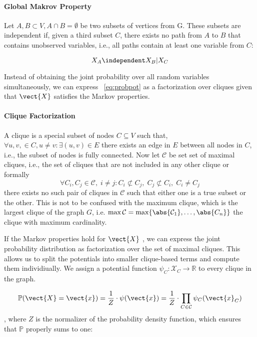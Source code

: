 \paragraph*{Global Makrov Property}
Let $A, B \subset V, A \cap B = \emptyset$ be two subsets of vertices from G. 
These subsets are independent if, given a third subset $C$, there exists no path from $A$ to $B$ that contains unobserved variables, i.e., all paths contain at least one variable from $C$:

\begin{equation}
    X_A \independent X_B \lvert X_C
\end{equation}

Instead of obtaining the joint probability over all random variables simultaneously, we can express \eq~\ref{eq:probpot} as a factorization over cliques given that $\vect{X}$ satisfies the Markov properties. 

\paragraph*{Clique Factorization}

A clique is a special subset of nodes $C \subseteq V$ such that, $\forall u,v,  \in C, u \neq v: \exists (u,v) \in E$ there exists an edge in $E$ between all nodes in $C$, i.e., the subset of nodes is fully connected.
Now let $\mathcal{C}$ be set set of maximal cliques, i.e., the set of cliques that are not included in any other clique or formally 
\begin{equation}
    \forall C_i, C_j \in \mathcal{C},\; i \neq j  : C_i \not\subset C_j,\; C_j \not\subset C_i,\; C_i \neq C_j
\end{equation}
there exists no such pair of cliques in $\mathcal{C}$ such that either one is a true subset or the other.
This is not to be confused with the maximum clique, which is the largest clique of the graph $G$, i.e. $\max \mathcal{C} = \max \{\abs{\mathcal{C}_1}, \ldots, \abs{C_n}\}$ the clique with maximum cardinality.

If the Markov properties hold for $\vect{X}$ , we can express the joint probability distribution as factorization over the set of maximal cliques.
This allows us to split the potentials into smaller clique-based terms and compute them individiually. 
We assign a potential function $\psi_C: \mathcal{X}_C \rightarrow \mathbb{R}$ to every clique in the graph.

\begin{equation}
        \mathbb{P}(\vect{X}=\vect{x}) = \frac{1}{Z} \cdot \psi(\vect{x})= \frac{1}{Z} \cdot \prod_{C \in \mathcal{C}} \psi_C(\vect{x}_C)
\end{equation},
where $Z$ is the normalizer of the probability density function, which ensures that $\mathbb{P}$  properly sums to one:

